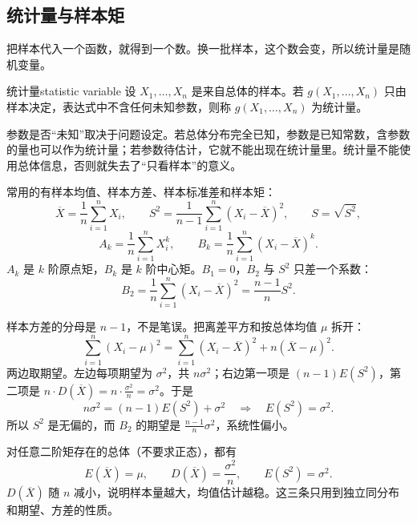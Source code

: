 \subsection{统计量与样本矩}

把样本代入一个函数，就得到一个数。换一批样本，这个数会变，所以统计量是随机变量。

\begin{mydef}{统计量}{statistic variable}
    设 $X_1,\dots,X_n$ 是来自总体的样本。若 $g(X_1,\dots,X_n)$ 只由样本决定，表达式中不含任何未知参数，则称 $g(X_1,\dots,X_n)$ 为统计量。
\end{mydef}

参数是否“未知”取决于问题设定。若总体分布完全已知，参数是已知常数，含参数的量也可以作为统计量；若参数待估计，它就不能出现在统计量里。统计量不能使用总体信息，否则就失去了“只看样本”的意义。

常用的有样本均值、样本方差、样本标准差和样本矩：
\[
    \overline{X}=\frac{1}{n}\sum_{i=1}^{n}X_i,\qquad
    S^2=\frac{1}{n-1}\sum_{i=1}^{n}(X_i-\overline{X})^2,\qquad
    S=\sqrt{S^2},
\]
\[
    A_k=\frac{1}{n}\sum_{i=1}^{n}X_i^k,\qquad
    B_k=\frac{1}{n}\sum_{i=1}^{n}(X_i-\overline{X})^k.
\]
$A_k$ 是 $k$ 阶原点矩，$B_k$ 是 $k$ 阶中心矩。$B_1=0$，$B_2$ 与 $S^2$ 只差一个系数：
\[
    B_2=\frac{1}{n}\sum_{i=1}^{n}(X_i-\overline{X})^2=\frac{n-1}{n}S^2.
\]

样本方差的分母是 $n-1$，不是笔误。把离差平方和按总体均值 $\mu$ 拆开：
\[
    \sum_{i=1}^{n}(X_i-\mu)^2
    =\sum_{i=1}^{n}(X_i-\overline{X})^2+n(\overline{X}-\mu)^2.
\]
两边取期望。左边每项期望为 $\sigma^2$，共 $n\sigma^2$；右边第一项是 $(n-1)E(S^2)$，第二项是 $n\cdot D(\overline{X})=n\cdot\frac{\sigma^2}{n}=\sigma^2$。于是
\[
    n\sigma^2=(n-1)E(S^2)+\sigma^2
    \quad\Longrightarrow\quad
    E(S^2)=\sigma^2.
\]
所以 $S^2$ 是无偏的，而 $B_2$ 的期望是 $\frac{n-1}{n}\sigma^2$，系统性偏小。

对任意二阶矩存在的总体（不要求正态），都有
\[
    E(\overline{X})=\mu,\qquad
    D(\overline{X})=\frac{\sigma^2}{n},\qquad
    E(S^2)=\sigma^2.
\]
$D(\overline{X})$ 随 $n$ 减小，说明样本量越大，均值估计越稳。这三条只用到独立同分布和期望、方差的性质。

